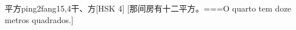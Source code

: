 \begin{EntryWithPhonetic}{平方}{ping2fang1}{5,4}{⼲、⽅}[HSK 4]
  [那间房有十二平方。===O quarto tem doze metros quadrados.]
\end{EntryWithPhonetic}

